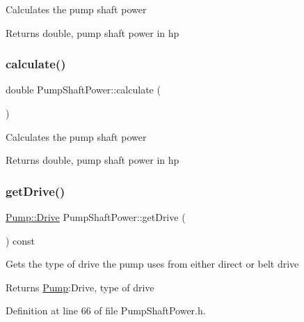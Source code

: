 Calculates the pump shaft power

\begin{DoxyReturn}{Returns}
double, pump shaft power in hp 
\end{DoxyReturn}
\mbox{\label{class_pump_shaft_power_aad32bf26469a5f2984c85ba07c3f84d9}} 
\subsubsection{\texorpdfstring{calculate()}{calculate()}\hspace{0.1cm}{\footnotesize\ttfamily [3/3]}}
{\footnotesize\ttfamily double Pump\+Shaft\+Power\+::calculate (\begin{DoxyParamCaption}{ }\end{DoxyParamCaption})}

Calculates the pump shaft power

\begin{DoxyReturn}{Returns}
double, pump shaft power in hp 
\end{DoxyReturn}
\mbox{\label{class_pump_shaft_power_a3d6529d7f5ce8ef194af9abe5e6399b6}} 
\subsubsection{\texorpdfstring{get\+Drive()}{getDrive()}\hspace{0.1cm}{\footnotesize\ttfamily [1/3]}}
{\footnotesize\ttfamily \hyperlink{class_pump_a32bf0ade131a11bb3b3fb374f638e983}{Pump\+::\+Drive} Pump\+Shaft\+Power\+::get\+Drive (\begin{DoxyParamCaption}{ }\end{DoxyParamCaption}) const\hspace{0.3cm}{\ttfamily [inline]}}

Gets the type of drive the pump uses from either direct or belt drive

\begin{DoxyReturn}{Returns}
\hyperlink{class_pump}{Pump}\+:Drive, type of drive 
\end{DoxyReturn}


Definition at line 66 of file Pump\+Shaft\+Power.\+h.

